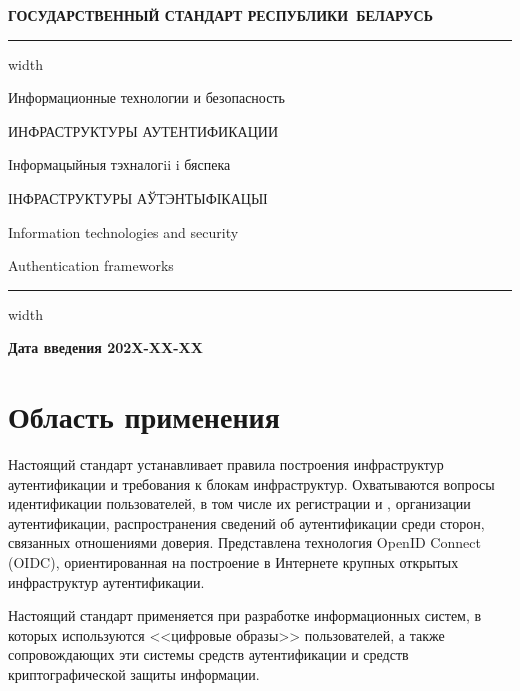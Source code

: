 \newpage
\setcounter{page}{1}
\pagestyle{headings}

\begin{center}
{\bfseries
ГОСУДАРСТВЕННЫЙ СТАНДАРТ РЕСПУБЛИКИ~БЕЛАРУСЬ
\vskip 2pt
\hrule width\textwidth

\vskip 9pt

Информационные технологии и безопасность

ИНФРАСТРУКТУРЫ АУТЕНТИФИКАЦИИ

\vskip 9pt

Iнформацыйныя тэхналогii i бяспека

ІНФРАСТРУКТУРЫ АЎТЭНТЫФІКАЦЫІ
}

\vskip 9pt

Information technologies and security

Authentication frameworks

\vskip 4pt                
\hrule width \textwidth
\end{center}

\mbox{}\hfill{\bfseries Дата введения 202X-XX-XX}

\chapter{Область применения}\label{Scope}

Настоящий стандарт устанавливает правила построения инфраструктур 
аутентификации и требования к блокам инфраструктур. 
%        
Охватываются вопросы идентификации пользователей, 
в том числе их регистрации и , 
организации аутентификации, распространения сведений об
аутентификации среди сторон, связанных отношениями доверия. 
%
Представлена технология OpenID Connect (OIDC), ориентированная на построение
в Интернете крупных открытых инфраструктур аутентификации.

Настоящий стандарт применяется при разработке информационных систем,
в которых используются <<цифровые образы>> пользователей, а также 
сопровождающих эти системы средств аутентификации и средств криптографической 
защиты информации.

